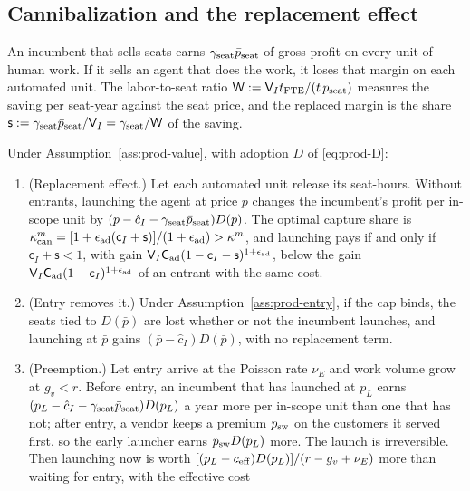 \subsection{Cannibalization and the replacement effect}\label{sec:product-cannibal}

An incumbent that sells seats earns $\gamma_{\rm seat}\bar p_{\rm seat}$ of gross profit on every unit of human work. If it sells an agent that does the work, it loses that margin on each automated unit. The labor-to-seat ratio $\mathsf W:=\mathsf V_It_{\rm FTE}/(t\,p_{\rm seat})$ measures the saving per seat-year against the seat price, and the replaced margin is the share $\mathsf s:=\gamma_{\rm seat}\bar p_{\rm seat}/\mathsf V_I=\gamma_{\rm seat}/\mathsf W$ of the saving.

\begin{proposition}[Cannibalization]\label{prop:prod-cannibal}
Under Assumption~\ref{ass:prod-value}, with adoption $D$ of \eqref{eq:prod-D}:
\begin{enumerate}
\item[(a)] (Replacement effect.) Let each automated unit release its seat-hours. Without entrants, launching the agent at price $p$ changes the incumbent's profit per in-scope unit by $(p-\hat c_I-\gamma_{\rm seat}\bar p_{\rm seat})D(p)$. The optimal capture share is $\kappa^m_{\rm can}=[1+\epsilon_{\rm ad}(\mathsf c_I+\mathsf s)]/(1+\epsilon_{\rm ad})>\kappa^m$, and launching pays if and only if $\mathsf c_I+\mathsf s<1$, with gain $\mathsf V_I\mathsf C_{\rm ad}(1-\mathsf c_I-\mathsf s)^{1+\epsilon_{\rm ad}}$, below the gain $\mathsf V_I\mathsf C_{\rm ad}(1-\mathsf c_I)^{1+\epsilon_{\rm ad}}$ of an entrant with the same cost.
\item[(b)] (Entry removes it.) Under Assumption~\ref{ass:prod-entry}, if the cap binds, the seats tied to $D(\bar p)$ are lost whether or not the incumbent launches, and launching at $\bar p$ gains $(\bar p-\hat c_I)D(\bar p)$, with no replacement term.
\item[(c)] (Preemption.) Let entry arrive at the Poisson rate $\nu_E$ and work volume grow at $g_v<r$. Before entry, an incumbent that has launched at $p_L$ earns $(p_L-\hat c_I-\gamma_{\rm seat}\bar p_{\rm seat})D(p_L)$ a year more per in-scope unit than one that has not; after entry, a vendor keeps a premium $p_{\rm sw}$ on the customers it served first, so the early launcher earns $p_{\rm sw}D(p_L)$ more. The launch is irreversible. Then launching now is worth $[(p_L-c_{\rm eff})D(p_L)]/(r-g_v+\nu_E)$ more than waiting for entry, with the effective cost

\end{enumerate}
\end{proposition}
